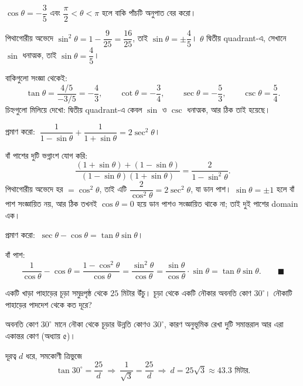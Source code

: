 \documentclass[11pt]{article}
\begin{document}
 $\cos\theta = -\dfrac{3}{5}$ এবং $\dfrac{\pi}{2} < \theta < \pi$ হলে
বাকি পাঁচটি অনুপাত বের করো।

\begin{sol}
পিথাগোরীয় অভেদে
$\sin^2\theta = 1 - \dfrac{9}{25} = \dfrac{16}{25}$, তাই
$\sin\theta = \pm\dfrac{4}{5}$। $\theta$ দ্বিতীয় quadrant-এ, সেখানে $\sin$
ধনাত্মক, তাই $\sin\theta = \dfrac{4}{5}$।

বাকিগুলো সংজ্ঞা থেকেই:
\[
  \tan\theta = \frac{4/5}{-3/5} = -\frac{4}{3}, \qquad
  \cot\theta = -\frac{3}{4}, \qquad
  \sec\theta = -\frac{5}{3}, \qquad
  \csc\theta = \frac{5}{4} .
\]
চিহ্নগুলো মিলিয়ে দেখো: দ্বিতীয় quadrant-এ কেবল $\sin$ ও $\csc$ ধনাত্মক, আর
ঠিক তাই হয়েছে।
\end{sol}

 প্রমাণ করো:
$\ \dfrac{1}{1 - \sin\theta} + \dfrac{1}{1 + \sin\theta} = 2\sec^2\theta$।

\begin{sol}
বাঁ পাশের দুটি ভগ্নাংশ যোগ করি:
\[
  \frac{(1 + \sin\theta) + (1 - \sin\theta)}{(1 - \sin\theta)(1 + \sin\theta)}
  = \frac{2}{1 - \sin^2\theta} .
\]
পিথাগোরীয় অভেদে হর $= \cos^2\theta$, তাই এটি
$\dfrac{2}{\cos^2\theta} = 2\sec^2\theta$, যা ডান পাশ।
$\sin\theta = \pm 1$ হলে বাঁ পাশ সংজ্ঞায়িত নয়, আর ঠিক তখনই $\cos\theta = 0$
হয়ে ডান পাশও সংজ্ঞায়িত থাকে না; তাই দুই পাশের domain এক।
\end{sol}

 প্রমাণ করো: $\ \sec\theta - \cos\theta = \tan\theta \sin\theta$।

\begin{sol}
বাঁ পাশ:
\[
  \frac{1}{\cos\theta} - \cos\theta
  = \frac{1 - \cos^2\theta}{\cos\theta}
  = \frac{\sin^2\theta}{\cos\theta}
  = \frac{\sin\theta}{\cos\theta} \cdot \sin\theta
  = \tan\theta \sin\theta . \qquad \blacksquare
\]
\end{sol}

 একটি খাড়া পাহাড়ের চূড়া সমুদ্রপৃষ্ঠ থেকে $25$ মিটার উঁচু। চূড়া থেকে
একটি নৌকার অবনতি কোণ $30^\circ$। নৌকাটি পাহাড়ের পাদদেশ থেকে কত দূরে?

\begin{sol}
অবনতি কোণ $30^\circ$ মানে নৌকা থেকে চূড়ার উন্নতি কোণও $30^\circ$, কারণ
অনুভূমিক রেখা দুটি সমান্তরাল আর এরা একান্তর কোণ (অধ্যায় ৫)।

দূরত্ব $d$ ধরে, সমকোণী ত্রিভুজে
\[
  \tan 30^\circ = \frac{25}{d}
  \ \Longrightarrow\ \frac{1}{\sqrt{3}} = \frac{25}{d}
  \ \Longrightarrow\ d = 25\sqrt{3} \approx 43.3 \text{ মিটার} .
\]
\end{sol}
\end{document}
